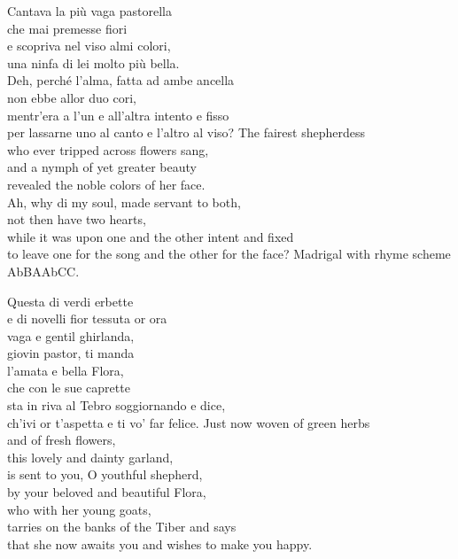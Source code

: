 \documentclass[12pt, twocolumn]{text-translation}
\begin{document}
Cantava la più vaga pastorella   \\
che mai premesse fiori   \\
e scopriva nel viso almi colori,  \\
una ninfa di lei molto più bella.  \\
Deh, perché l'alma, fatta ad ambe ancella   \\
non ebbe allor duo cori,   \\
mentr'era a l'un e all'altra intento e fisso   \\
per lassarne uno al canto e l'altro al viso? 
\poemasterisks
The fairest shepherdess  \\
who ever tripped across flowers sang,  \\
and a nymph of yet greater beauty  \\
revealed the noble colors of her face.  \\
Ah, why di my soul, made servant to both,  \\
not then have two hearts,  \\
while it was upon one and the other intent and fixed  \\
to leave one for the song and the other for the face? 
Madrigal with rhyme scheme AbBAAbCC.

Questa di verdi erbette  \\
e di novelli fior tessuta or ora  \\
vaga e gentil ghirlanda,  \\
giovin pastor, ti manda  \\
l'amata e bella Flora,  \\
che con le sue caprette  \\
sta in riva al Tebro soggiornando e dice,  \\
ch'ivi or t'aspetta e ti vo' far felice. 
\poemasterisks
Just now woven of green herbs  \\
and of fresh flowers,  \\
this lovely and dainty garland,  \\
is sent to you, O youthful shepherd,  \\
by your beloved and beautiful Flora,  \\
who with her young goats,  \\
tarries on the banks of the Tiber and says  \\
that she now awaits you and wishes to make you happy.
\end{document}
